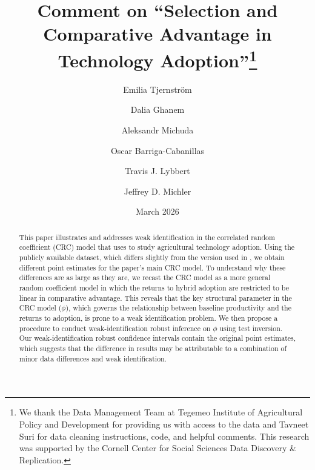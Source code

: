 \documentclass[12pt]{article}
\theoremstyle{plain}
\theoremstyle{definition}
\begin{document}
\begin{titlepage}
\title{Comment on \citet{S2011} ``Selection and Comparative Advantage in Technology Adoption''\thanks{We thank the Data Management Team at Tegemeo Institute of Agricultural Policy and Development for providing us with access to the data and Tavneet Suri for data cleaning instructions, code, and helpful comments. This research was supported by the Cornell Center for Social Sciences Data Discovery \& Replication.}}
   

	\author[1,2]{Emilia Tjernstr\"{o}m}
	\author[3]{Dalia Ghanem}
  	\author[4]{Aleksandr Michuda}
	\author[5]{Oscar Barriga-Cabanillas}
	\author[3]{Travis J. Lybbert}

     \author[6]{Jeffrey D. Michler}



	\date{March 2026}

	\clearpage\maketitle
	\thispagestyle{empty}

\begin{center}
    \begin{abstract}
		\noindent
			This paper illustrates and addresses weak identification in the correlated random coefficient (CRC) model that \citet{S2011} uses to study agricultural technology adoption.
            Using the publicly available  dataset, which differs slightly from the version used in \citet{S2011}, we obtain different point estimates for the paper's main CRC model.
            To understand why these differences are as large as they are, we recast the CRC model as a more general random coefficient model in which the returns to hybrid adoption are restricted to be linear in comparative advantage.
			This reveals that the key structural parameter in the CRC model ($\phi$), which governs the relationship between baseline productivity and the returns to adoption, is prone to a weak identification problem.
			We then propose a procedure to conduct weak-identification robust inference on $\phi$ using test inversion.
            Our weak-identification robust confidence intervals contain the original \citet{S2011} point estimates, which suggests that the difference in results may be attributable to a combination of minor data differences and weak identification.
	\end{abstract}
\end{center}


\end{titlepage}
\end{document}
